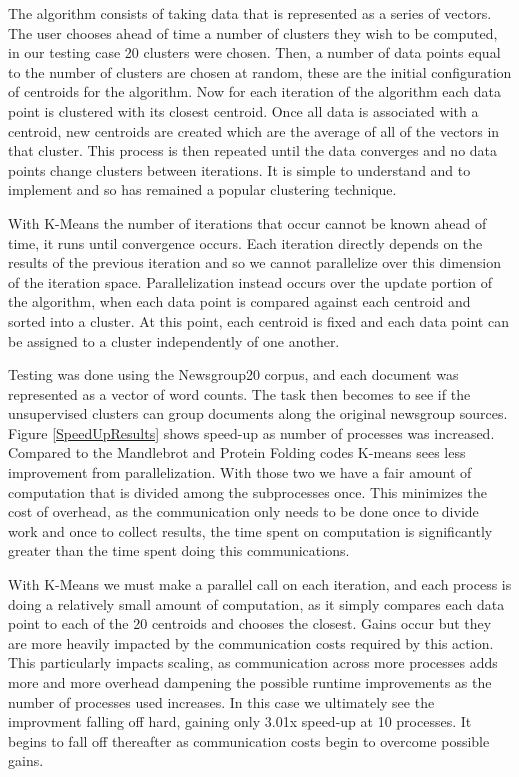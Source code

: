 \documentclass[conference]{IEEEtran}
\begin{document}
The algorithm consists of taking data that is represented as a series of vectors.
The user chooses ahead of time a number of clusters they wish to be computed, in
our testing case 20 clusters were chosen. 
Then, a number of data points equal to the number of clusters are chosen at random,
these are the initial configuration of centroids for the algorithm.
Now for each iteration of the algorithm each data point is clustered with its
closest centroid.
Once all data is associated with a centroid, new centroids are created which are the
average of all of the vectors in that cluster.
This process is then repeated until the data converges and no data points change clusters
between iterations.
It is simple to understand and to implement and so has remained  a popular clustering technique.

With K-Means the number of iterations that occur cannot be known ahead of time, it runs
until convergence occurs. 
Each iteration directly depends on the results of the previous iteration and so we cannot parallelize over this dimension of the iteration space.
Parallelization instead occurs over the update portion of the algorithm, when each data 
point is compared against each centroid and sorted into a cluster.
At this point, each centroid is fixed and each data point can be assigned to a cluster
independently of one another.

Testing was done using the Newsgroup20 corpus, and each document was represented as a 
vector of word counts.
The task then becomes to see if the unsupervised clusters can group documents
along the original newsgroup sources.
Figure \ref{SpeedUpResults} shows speed-up as number of processes was increased.
Compared to the Mandlebrot and Protein Folding codes K-means sees less improvement from parallelization.
With those two we have a fair amount of computation that is divided among the subprocesses once.
This minimizes the cost of overhead, as the communication only needs to be done
once to divide work and once to collect results, the time spent on computation
is significantly greater than the time spent doing this communications.

With K-Means we must make a parallel call on each iteration, and each process is doing 
a relatively small amount of computation, as it simply compares each data point
to each of the 20 centroids and chooses the closest. 
Gains occur but they are more heavily impacted by the communication costs required by 
this action.
This particularly impacts scaling, as communication across more processes adds more and
more overhead dampening the possible runtime improvements as the number of processes used
increases.
In this case we ultimately see the improvment falling off hard, gaining only 3.01x speed-up at 10 processes. 
It begins to fall off thereafter as communication costs begin to overcome possible gains.
\end{document}
